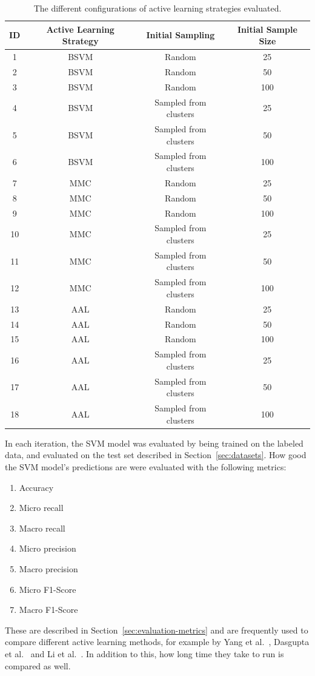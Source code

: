 \begin{table}
    \centering
    \begin{tabular}{|cccc|}
        \hline
        \textbf{ID} & \textbf{Active Learning Strategy} & \textbf{Initial Sampling} & \textbf{Initial Sample Size}\\
        \hline
        1 & BSVM & Random & 25\\
        2 & BSVM & Random & 50\\
        3 & BSVM & Random & 100\\
        4 & BSVM & Sampled from clusters & 25\\
        5 & BSVM & Sampled from clusters & 50\\
        6 & BSVM & Sampled from clusters & 100\\
        7 & MMC & Random & 25\\
        8 & MMC & Random & 50\\
        9 & MMC & Random & 100\\
        10 & MMC & Sampled from clusters & 25\\
        11 & MMC & Sampled from clusters & 50\\
        12 & MMC & Sampled from clusters & 100\\
        13 & AAL & Random & 25\\
        14 & AAL & Random & 50\\
        15 & AAL & Random & 100\\
        16 & AAL & Sampled from clusters & 25\\
        17 & AAL & Sampled from clusters & 50\\
        18 & AAL & Sampled from clusters & 100\\
        \hline
    \end{tabular}
    \caption{The different configurations of active learning strategies evaluated.}
    \label{fig:active-learning-configurations}
\end{table}


In each iteration, the SVM model was evaluated by being trained on the labeled data, and evaluated on the test set described in Section~\ref{sec:datasets}.
How good the SVM model's predictions are were evaluated with the following metrics:
\begin{enumerate}
    \item Accuracy
    \item Micro recall
    \item Macro recall
    \item Micro precision
    \item Macro precision
    \item Micro F1-Score
    \item Macro F1-Score
\end{enumerate}
These are described in Section~\ref{sec:evaluation-metrics} and are frequently used to compare different active learning methods, for example by Yang et al\@.~\cite{yang2009effective}, Dasgupta et al\@.~\cite{dasgupta2008hierarchical} and Li et al\@.~\cite{li2013active}.
In addition to this, how long time they take to run is compared as well.

